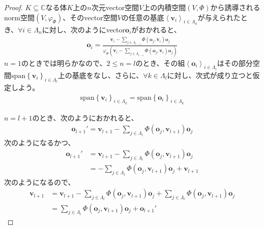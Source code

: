 \documentclass[dvipdfmx]{jsarticle}
\begin{document}
\begin{proof}
$K \subseteq \mathbb{C}$なる体$K$上の$n$次元vector空間$V$上の内積空間$(V,\varPhi)$から誘導されるnorm空間$\left( V,\varphi_{\varPhi} \right)$、そのvector空間$V$の任意の基底$\left\langle \mathbf{v}_{i} \right\rangle_{i \in \varLambda_{n}}$が与えられたとき、$\forall i \in \varLambda_{n}$に対し、次のようにvector$\mathbf{o}_{i}$がおかれると、
\begin{align*}
\mathbf{o}_{i} = \frac{\mathbf{v}_{i} - \sum_{j \in \varLambda_{i - 1}} {\varPhi\left( \mathbf{o}_{j},\mathbf{v}_{i} \right)\mathbf{o}_{j}}}{\varphi_{\varPhi}\left( \mathbf{v}_{i} - \sum_{j \in \varLambda_{i - 1}} {\varPhi\left( \mathbf{o}_{j},\mathbf{v}_{i} \right)\mathbf{o}_{j}} \right)}
\end{align*}
$n = 1$のときでは明らかなので、$2 \leq n = l$のとき、その組$\left\langle \mathbf{o}_{i} \right\rangle_{i \in \varLambda_{l}}$はその部分空間$\mathrm{span}\left\{ \mathbf{v}_{i} \right\}_{i \in \varLambda_{l}}$上の基底をなし、さらに、$\forall k \in \varLambda_{l}$に対し、次式が成り立つと仮定しよう。
\begin{align*}
\mathrm{span}\left\{ \mathbf{v}_{i} \right\}_{i \in \varLambda_{k}} = \mathrm{span}\left\{ \mathbf{o}_{i} \right\}_{i \in \varLambda_{k}}
\end{align*}\par
$n = l + 1$のとき、次のようにおかれると、
\begin{align*}
\mathbf{o}_{l + 1}' = \mathbf{v}_{l + 1} - \sum_{j \in \varLambda_{l}} {\varPhi\left( \mathbf{o}_{j},\mathbf{v}_{l + 1} \right)\mathbf{o}_{j}}
\end{align*}
次のようになるかつ、
\begin{align*}
\mathbf{o}_{l + 1}' &= \mathbf{v}_{l + 1} - \sum_{j \in \varLambda_{l}} {\varPhi\left( \mathbf{o}_{j},\mathbf{v}_{l + 1} \right)\mathbf{o}_{j}}\\
&= - \sum_{j \in \varLambda_{l}} {\varPhi\left( \mathbf{o}_{j},\mathbf{v}_{l + 1} \right)\mathbf{o}_{j}} + \mathbf{v}_{l + 1}
\end{align*}
次のようになるので、
\begin{align*}
\mathbf{v}_{l + 1} &= \mathbf{v}_{l + 1} - \sum_{j \in \varLambda_{l}} {\varPhi\left( \mathbf{o}_{j},\mathbf{v}_{l + 1} \right)\mathbf{o}_{j}} + \sum_{j \in \varLambda_{l}} {\varPhi\left( \mathbf{o}_{j},\mathbf{v}_{l + 1} \right)\mathbf{o}_{j}}\\
&= \sum_{j \in \varLambda_{l}} {\varPhi\left( \mathbf{o}_{j},\mathbf{v}_{l + 1} \right)\mathbf{o}_{j}} + \mathbf{o}_{l + 1}'

\end{align*}
\end{proof}
\end{document}
